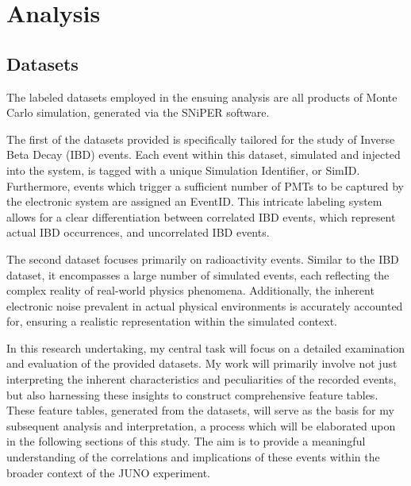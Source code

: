 \chapter{Analysis}

\section{Datasets}
The labeled datasets employed in the ensuing analysis are all products of Monte Carlo simulation, generated via the SNiPER software.

The first of the datasets provided is specifically tailored for the study of Inverse Beta Decay (IBD) events. Each event within this dataset, simulated and injected into the system, is tagged with a unique Simulation Identifier, or SimID. Furthermore, events which trigger a sufficient number of PMTs to be captured by the electronic system are assigned an EventID. This intricate labeling system allows for a clear differentiation between correlated IBD events, which represent actual IBD occurrences, and uncorrelated IBD events.


The second dataset focuses primarily on radioactivity events. Similar to the IBD dataset, it encompasses a large number of simulated events, each reflecting the complex reality of real-world physics phenomena. Additionally, the inherent electronic noise prevalent in actual physical environments is accurately accounted for, ensuring a realistic representation within the simulated context.

In this research undertaking, my central task will focus on a detailed examination and evaluation of the provided datasets. My work will primarily involve not just interpreting the inherent characteristics and peculiarities of the recorded events, but also harnessing these insights to construct comprehensive feature tables. These feature tables, generated from the datasets, will serve as the basis for my subsequent analysis and interpretation, a process which will be elaborated upon in the following sections of this study. The aim is to provide a meaningful understanding of the correlations and implications of these events within the broader context of the JUNO experiment.


